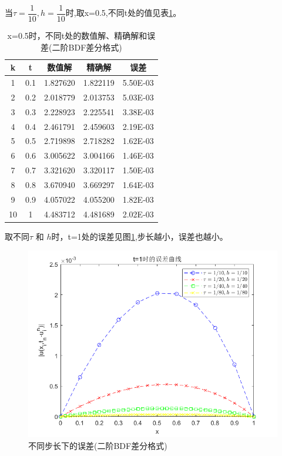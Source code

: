 \documentclass[withoutpreface,bwprint]{cumcmthesis} %
\begin{document}
当$\tau=\dfrac{1}{10},h=\dfrac{1}{10}$时,取x=0.5,不同t处的值见表\ref{tab:5}。
\begin{table}[htbp]
	\centering
	\caption{x=0.5时，不同t处的数值解、精确解和误差(二阶BDF差分格式)}
	\begin{tabular}{ccccc}
		\toprule[1.5pt]
		k     & t     & 数值解   & 精确解   & 误差 \\
		\midrule[1pt]
		1     & 0.1   & 1.827620  & 1.822119  & 5.50E-03 \\
		2     & 0.2   & 2.018779  & 2.013753  & 5.03E-03 \\
		3     & 0.3   & 2.228923  & 2.225541  & 3.38E-03 \\
		4     & 0.4   & 2.461791  & 2.459603  & 2.19E-03 \\
		5     & 0.5   & 2.719898  & 2.718282  & 1.62E-03 \\
		6     & 0.6   & 3.005622  & 3.004166  & 1.46E-03 \\
		7     & 0.7   & 3.321620  & 3.320117  & 1.50E-03 \\
		8     & 0.8   & 3.670940  & 3.669297  & 1.64E-03 \\
		9     & 0.9   & 4.057022  & 4.055200  & 1.82E-03 \\
		10    & 1     & 4.483712  & 4.481689  & 2.02E-03 \\
		\bottomrule[1.5pt]
	\end{tabular}%
	\label{tab:5}%
\end{table}%

取不同$\tau$ 和 $h$时，t=1处的误差见图\ref{fig:f6},步长越小，误差也越小。
\begin{figure}
	\centering
	\includegraphics[width=0.7\linewidth]{figures/f6}
	\caption{不同步长下的误差(二阶BDF差分格式)}
	\label{fig:f6}
\end{figure}
\end{document}
